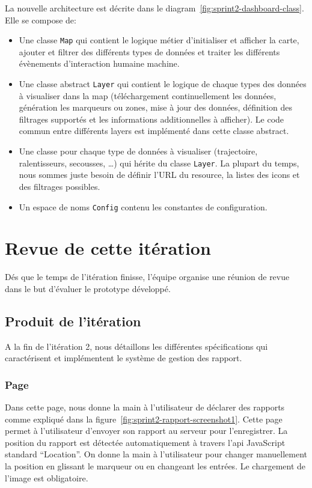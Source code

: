 La nouvelle architecture est décrite dans le
diagram~\ref{fig:sprint2-dashboard-class}. Elle se compose de:

\begin{itemize}
    \item Une classe \verb|Map| qui contient le logique métier d'initialiser et
        afficher la carte, ajouter et filtrer des différents types de données
        et traiter les différents évènements d'interaction humaine machine.
    \item Une classe abstract \verb|Layer| qui contient le logique de
        chaque types des données à visualiser dans la map (téléchargement
        continuellement les données, génération les marqueurs ou zones, mise à
        jour des données, définition des filtrages supportés et les
        informations additionnelles à afficher). Le code commun entre
        différents layers est implémenté dans cette classe abstract.
    \item Une classe pour chaque type de données à visualiser (trajectoire,
        ralentisseurs, secousses, \ldots) qui hérite du classe \verb|Layer|. La
        plupart du temps, nous sommes juste besoin de définir l'URL du
        resource, la listes des icons et des filtrages possibles.
    \item Un espace de noms \verb|Config| contenu les constantes de
        configuration.
\end{itemize}

\section{Revue de cette itération}

Dés que le temps de l'itération finisse, l'équipe organise une réunion de revue
dans le but d'évaluer le prototype développé.

\subsection{Produit de l'itération}

A la fin de l'itération 2, nous détaillons les différentes spécifications qui
caractérisent et implémentent le système de gestion des rapport.

\subsubsection{Page }

Dans cette page, nous donne la main à l'utilisateur de déclarer des rapports
comme expliqué dans la figure~\ref{fig:sprint2-rapport-screenshot1}. Cette page
permet à l'utilisateur d'envoyer son rapport au serveur pour l'enregistrer. La
position du rapport est détectée automatiquement à travers l'api JavaScript
standard ``Location''. On donne la main à l'utilisateur pour changer
manuellement la position en glissant le marqueur ou en changeant les entrées.
Le chargement de l'image est obligatoire.

